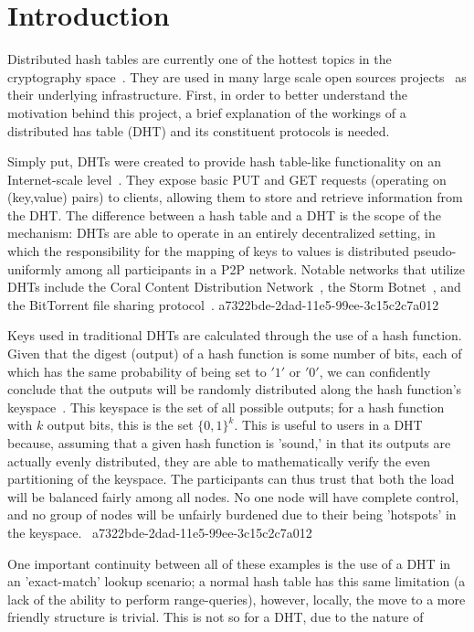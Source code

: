 \documentclass[12pt]{article}
\begin{document}
\section{Introduction}
\par Distributed hash tables are currently one of the hottest topics in the cryptography space~\cite{Stoica:2001dj,Rowstron:2001ea,Ratnasamy:2001wn}. They are used in many large scale open sources projects~\cite{Freitas:2013tb,Xu:2010vs,Perfitt:2010fh} as their underlying infrastructure. First, in order to better understand the motivation behind this project, a brief explanation of the workings of a distributed has table (DHT) and its constituent protocols is needed.

\par Simply put, DHTs were created to provide hash table-like functionality on an Internet-scale level~\cite{Ratnasamy:2001wn}. They expose basic PUT and GET requests (operating on (key,value) pairs) to clients, allowing them to store and retrieve information from the DHT. The difference between a hash table and a DHT is the scope of the mechanism: DHTs are able to operate in an entirely decentralized setting, in which the responsibility for the mapping of keys to values is distributed pseudo-uniformly among all participants in a P2P network. Notable networks that utilize DHTs include the Coral Content Distribution Network~\cite{Freedman:2004vb}, the Storm Botnet~\cite{Holz:2008uk}, and the BitTorrent file sharing protocol~\cite{Cohen:y1_8mBnw}.
a7322bde-2dad-11e5-99ee-3c15c2c7a012
\par Keys used in traditional DHTs are calculated through the use of a hash function. Given that the digest (output) of a hash function is some number of bits, each of which has the same probability of being set to $'1'$ or $'0'$, we can confidently conclude that the outputs will be randomly distributed along the hash function's keyspace~. This keyspace is the set of all possible outputs; for a hash function with $k$ output bits, this is the set $\{0,1\}^k$. This is useful to users in a DHT because, assuming that a given hash function is 'sound,' in that its outputs are actually evenly distributed, they are able to mathematically verify the even partitioning of the keyspace. The participants can thus trust that both the load will be balanced fairly among all nodes. No one node will have complete control, and no group of nodes will be unfairly burdened due to their being 'hotspots' in the keyspace.~
a7322bde-2dad-11e5-99ee-3c15c2c7a012
\par One important continuity between all of these examples is the use of a DHT in an 'exact-match' lookup scenario; a normal hash table has this same limitation (a lack of the ability to perform range-queries), however, locally, the move to a more friendly structure is trivial. This is not so for a DHT, due to the nature of
\printbibliography
\end{document}
